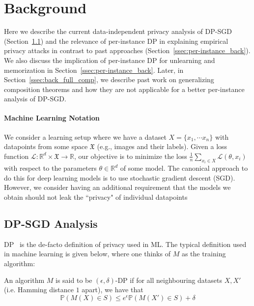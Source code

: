 \section{Background}

Here we describe the current data-independent privacy analysis of DP-SGD (Section~\ref{ssec:DP-SGD_back}) and the relevance of per-instance DP in explaining empirical privacy attacks in contrast to past approaches (Section~\ref{ssec:per-instance_back}). We also discuss the implication of per-instance DP for unlearning and memorization in Section~\ref{ssec:per-instance_back}. Later, in Section~\ref{ssec:back_full_comp}, we describe past work on generalizing composition theorems and how they are not applicable for a better per-instance analysis of DP-SGD.


\paragraph{Machine Learning Notation}
We consider a learning setup where we have a dataset $X = \{x_1,\cdots x_n\}$ with datapoints from some space $\mathfrak{X}$ (e.g., images and their labels). Given a loss function $\mathcal{L}: \mathbb{R}^d \times \mathfrak{X} \rightarrow \mathbb{R}$, our objective is to minimize the loss $\frac{1}{n}\sum_{x_i \in X} \mathcal{L}(\theta,x_i)$ with respect to the parameters $\theta \in \mathbb{R}^d$ of some model. The canonical approach to do this for deep learning models is to use stochastic gradient descent (SGD). However, we consider having an additional requirement that the models we obtain should not leak the ``privacy" of individual datapoints

\subsection{DP-SGD Analysis}
\label{ssec:DP-SGD_back}






DP~\citep{dwork2006calibrating} is the de-facto definition of privacy used in ML. The typical definition used in machine learning is given below, where one thinks of $M$ as the training algorithm:

\begin{definition}
    An algorithm $M$ is said to be $(\epsilon,\delta)$-DP if for all neighbouring datasets $X, X'$ (i.e. Hamming distance $1$ apart), we have that $$\mathbb{P}(M(X) \in S) \leq e^{\epsilon} \mathbb{P}(M(X') \in S) + \delta$$
\end{definition}

